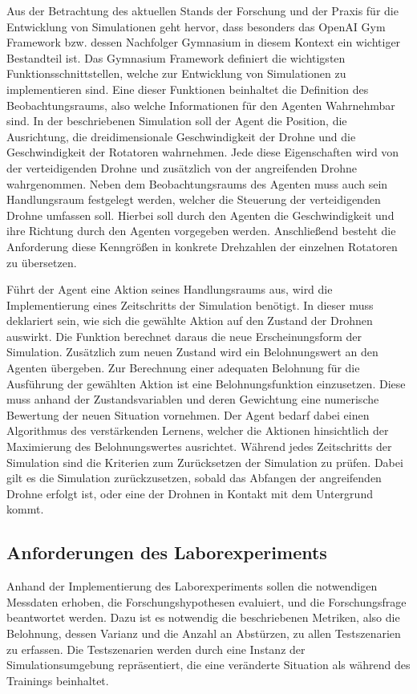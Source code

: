 Aus der Betrachtung des aktuellen Stands der Forschung und der Praxis für die Entwicklung von Simulationen geht hervor, dass besonders das OpenAI Gym Framework bzw. dessen Nachfolger Gymnasium in diesem Kontext ein wichtiger Bestandteil ist.
Das Gymnasium Framework definiert die wichtigsten Funktionsschnittstellen, welche zur Entwicklung von Simulationen zu implementieren sind.
Eine dieser Funktionen beinhaltet die Definition des Beobachtungsraums, also welche Informationen für den Agenten Wahrnehmbar sind. 
In der beschriebenen Simulation soll der Agent die Position, die Ausrichtung, die dreidimensionale Geschwindigkeit der Drohne und die Geschwindigkeit der Rotatoren wahrnehmen.
Jede diese Eigenschaften wird von der verteidigenden Drohne und zusätzlich von der angreifenden Drohne wahrgenommen. 
Neben dem Beobachtungsraums des Agenten muss auch sein Handlungsraum festgelegt werden, welcher die Steuerung der verteidigenden Drohne umfassen soll.
Hierbei soll durch den Agenten die Geschwindigkeit und ihre Richtung durch den Agenten vorgegeben werden.
Anschließend besteht die Anforderung diese Kenngrößen in konkrete Drehzahlen der einzelnen Rotatoren zu übersetzen.

Führt der Agent eine Aktion seines Handlungsraums aus, wird die Implementierung eines Zeitschritts der Simulation benötigt.
In dieser muss deklariert sein, wie sich die gewählte Aktion auf den Zustand der Drohnen auswirkt.
Die Funktion berechnet daraus die neue Erscheinungsform der Simulation.
Zusätzlich zum neuen Zustand wird ein Belohnungswert an den Agenten übergeben.
Zur Berechnung einer adequaten Belohnung für die Ausführung der gewählten Aktion ist eine Belohnungsfunktion einzusetzen.
Diese muss anhand der Zustandsvariablen und deren Gewichtung eine numerische Bewertung der neuen Situation vornehmen.
Der Agent bedarf dabei einen Algorithmus des verstärkenden Lernens, welcher die Aktionen hinsichtlich der Maximierung des Belohnungswertes ausrichtet. 
Während jedes Zeitschritts der Simulation sind die Kriterien zum Zurücksetzen der Simulation zu prüfen.
Dabei gilt es die Simulation zurückzusetzen, sobald das Abfangen der angreifenden Drohne erfolgt ist, oder eine der Drohnen in Kontakt mit dem Untergrund kommt.

\subsection{Anforderungen des Laborexperiments}

Anhand der Implementierung des Laborexperiments sollen die notwendigen Messdaten erhoben, die Forschungshypothesen evaluiert, und die Forschungsfrage beantwortet werden.
Dazu ist es notwendig die beschriebenen Metriken, also die Belohnung, dessen Varianz und die Anzahl an Abstürzen, zu allen Testszenarien zu erfassen.
Die Testszenarien werden durch eine Instanz der Simulationsumgebung repräsentiert, die eine veränderte Situation als während des Trainings beinhaltet.

